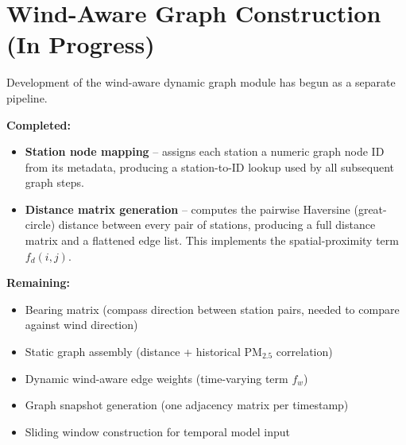 \section{Wind-Aware Graph Construction (In Progress)}

Development of the wind-aware dynamic graph module has begun as a separate pipeline.

\textbf{Completed:}
\begin{itemize}
    \item \textbf{Station node mapping} -- assigns each station a numeric graph node ID from its metadata, producing a station-to-ID lookup used by all subsequent graph steps.
    \item \textbf{Distance matrix generation} -- computes the pairwise Haversine (great-circle) distance between every pair of stations, producing a full distance matrix and a flattened edge list. This implements the spatial-proximity term $f_d(i,j)$.
\end{itemize}

\textbf{Remaining:}
\begin{itemize}
    \item Bearing matrix (compass direction between station pairs, needed to compare against wind direction)
    \item Static graph assembly (distance + historical PM$_{2.5}$ correlation)
    \item Dynamic wind-aware edge weights (time-varying term $f_w$)
    \item Graph snapshot generation (one adjacency matrix per timestamp)
    \item Sliding window construction for temporal model input
\end{itemize}
